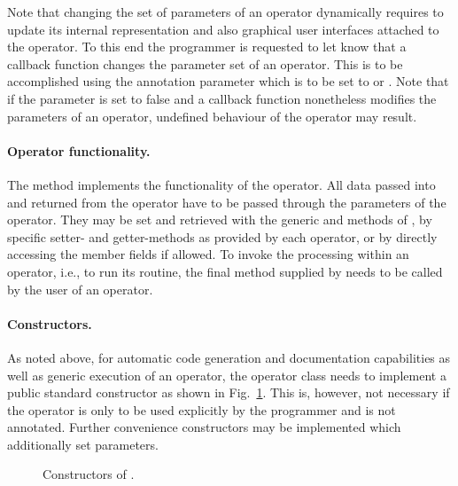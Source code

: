 Note that changing the set of parameters of an operator
dynamically requires \alida to update its internal representation and also graphical user interfaces
attached to the operator. To this end the programmer is requested to let \alida know that a callback
function changes the parameter set of an operator. This is to be accomplished using the
annotation parameter  which is to be set to  or
. Note that if the parameter is set to false and a callback function nonetheless 
modifies the parameters of an operator, undefined behaviour of the operator may result.

\paragraph{Operator functionality.}
The method  implements the functionality of the operator. All data
passed into and returned from the operator have to be passed through the parameters of the operator.
They may be set and retrieved with the generic
 and  methods
of , by specific setter- and getter-methods as provided by
each operator, or by
directly accessing the member fields if allowed.
To invoke the processing within an operator, i.e., to run its 
routine, the final method  supplied by  needs to be called by the user of an operator.

\paragraph{Constructors.}
As noted above, 
for automatic code generation and documentation capabilities as well as generic execution 
of an operator,
the operator class needs to implement 
a public standard constructor 
as shown in Fig.~\ref{exa:constructor}.
This is, however, not necessary if the operator is only to be used explicitly
by the programmer and is not annotated.
Further convenience constructors may be implemented which additionally set
parameters.

\begin{figure}

\caption{\label{exa:constructor}Constructors of .}
\end{figure}

